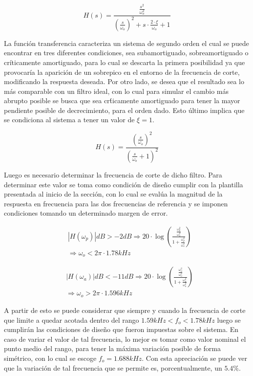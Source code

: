 \begin{equation}
    H(s) = \frac{ \frac{s^{2}}{\omega_o^{2}} }{\left(\frac{s}{\omega_o}\right)^{2} + s \cdot \frac{2 \cdot \xi}{\omega_o} + 1}
\end{equation}

La funci\'on transferencia caracteriza un sistema de segundo orden el cual se puede encontrar en tres diferentes condiciones, sea subamortiguado, sobreamortiguado o cr\'iticamente amortiguado,
para lo cual se descarta la primera posibilidad ya que provocar\'ia la aparici\'on de un sobrepico en el entorno de la frecuencia de corte, modificando la respuesta deseada. Por otro lado, se desea que el resultado
sea lo m\'as comparable con un filtro ideal, con lo cual para simular el cambio m\'as abrupto posible se busca que sea cr\'ticamente amortiguado para tener la mayor pendiente posible de decrecimiento, para el orden dado.
Esto \'ultimo implica que se condiciona al sistema a tener un valor de $\xi = 1$.

\begin{equation}
    H(s) = \frac{\left(\frac{s}{\omega_o}\right)^{2}}{\left(\frac{s}{\omega_o} + 1\right)^{2}}
    \label{eq:funcion_pasaaltos}
\end{equation}

Luego es necesario determinar la frecuencia de corte de dicho filtro. Para determinar este valor se toma como condici\'on de dise\~no cumplir con la plantilla presentada al inicio de la secci\'on, con lo cual
se eval\'ua la magnitud de la respuesta en frecuencia para las dos frecuencias de referencia y se imponen condiciones tomando un determinado margen de error.

\begin{eqnarray*}
    & |H(\omega_p)|dB > -2dB \Rightarrow 20 \cdot \log{\left( \frac{\frac{\omega_p^{2}}{\omega_o^{2}}}{1 + \frac{\omega_p^{2}}{\omega_o^{2}}} \right)} \\
    & \Rightarrow \omega_o < 2\pi \cdot 1.78kHz 
\end{eqnarray*}

\begin{eqnarray*}
    & |H(\omega_a)|dB < -11dB \Rightarrow 20 \cdot \log{ \left(  \frac{\frac{\omega_a^{2}}{\omega_o^{2}}}{1 + \frac{\omega_a^{2}}{\omega_o^{2}}} \right) } \\
    & \Rightarrow \omega_o > 2\pi \cdot 1.596kHz
\end{eqnarray*}

A partir de esto se puede considerar que siempre y cuando la frecuencia de corte que limite a quedar acotada dentro del rango $1.59kHz < f_o < 1.78kHz$ luego se cumplir\'an
las condiciones de dise\~no que fueron impuestas sobre el sistema. En caso de variar el valor de tal frecuencia, lo mejor es tomar como valor nominal el punto medio del rango, para tener la m\'axima
variaci\'on posible de forma sim\'etrico, con lo cual se escoge $f_o = 1.688kHz$. Con esta apreciaci\'on se puede ver que la variaci\'on de tal frecuencia que se permite es, porcentualmente,
un $5.4\%$.

